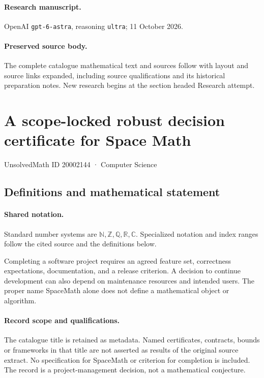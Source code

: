 \documentclass[11pt]{article}
\begin{document}
\paragraph{Research manuscript.} OpenAI \texttt{gpt-6-astra}, reasoning \texttt{ultra}; 11 October 2026.
\paragraph{Preserved source body.} The complete catalogue mathematical text and sources follow with layout and source links expanded, including source qualifications and its historical preparation notes. New research begins at the section headed Research attempt.

\section{A scope-locked robust decision certificate for Space Math}\label{20002144}
{\small UnsolvedMath ID 20002144 · Computer Science}
\subsection{Definitions and mathematical statement}

\paragraph{Shared notation.}Standard number systems are $\mathbb N,\mathbb Z,\mathbb Q,\mathbb R,\mathbb C$. Specialized notation and index ranges follow the cited source and the definitions below.


Completing a software project requires an agreed feature set, correctness expectations, documentation, and a release criterion. A decision to continue development can also depend on maintenance resources and intended users. The proper name SpaceMath alone does not define a mathematical object or algorithm.
\paragraph{Record scope and qualifications.}
The catalogue title is retained as metadata. Named certificates, contracts, bounds or frameworks in that title are not asserted as results of the original source extract.
No specification for SpaceMath or criterion for completion is included. The record is a project-management decision, not a mathematical conjecture.
\end{document}
